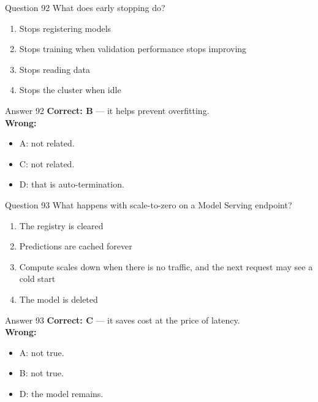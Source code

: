 \documentclass[aspectratio=169,11pt]{beamer}
\begin{document}
\begin{frame}{Question 92}
What does early stopping do?
\begin{enumerate}[label=\Alph*.]
\item Stops registering models
\item Stops training when validation performance stops improving
\item Stops reading data
\item Stops the cluster when idle
\end{enumerate}
\end{frame}
\begin{frame}{Answer 92}
\textbf{Correct: B} --- it helps prevent overfitting.\\
\vspace{0.5em}
\textbf{Wrong:}
\begin{itemize}
\item A: not related.
\item C: not related.
\item D: that is auto-termination.
\end{itemize}
\end{frame}

\begin{frame}{Question 93}
What happens with scale-to-zero on a Model Serving endpoint?
\begin{enumerate}[label=\Alph*.]
\item The registry is cleared
\item Predictions are cached forever
\item Compute scales down when there is no traffic, and the next request may see a cold start
\item The model is deleted
\end{enumerate}
\end{frame}
\begin{frame}{Answer 93}
\textbf{Correct: C} --- it saves cost at the price of latency.\\
\vspace{0.5em}
\textbf{Wrong:}
\begin{itemize}
\item A: not true.
\item B: not true.
\item D: the model remains.
\end{itemize}
\end{frame}
\end{document}
